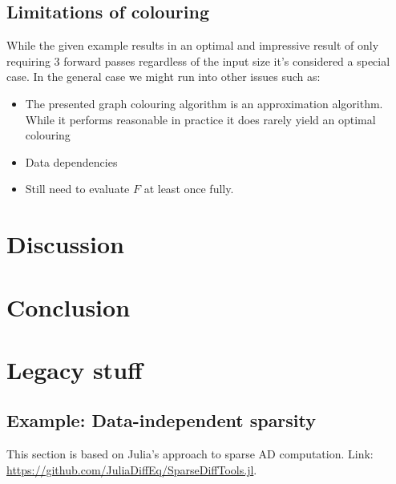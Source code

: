 \subsection{Limitations of colouring}
While the given example results in an optimal and impressive result of 
only requiring 3 forward passes regardless of the input size 
it's considered a special case. In the general case we might 
run into other issues such as:
\begin{itemize}
	\item The presented graph colouring algorithm is an approximation algorithm. 
	While it performs reasonable in practice it does rarely yield an optimal
	colouring
	\item Data dependencies
	\item Still need to evaluate $F$ at least once fully. 
\end{itemize}
	
	
\section{Discussion}
	
	
	
	
\section{Conclusion}
	
	
	
	
	
	
	
	
	
	
	
	
	
	
	
	
	
	
	
	
	\newpage 
	\newpage 
	
	\appendix
	\section{Legacy stuff}
	\subsection{Example: Data-independent sparsity}
	
	This section is based on Julia's approach to sparse AD computation. 
	Link: \url{https://github.com/JuliaDiffEq/SparseDiffTools.jl}. 
	

